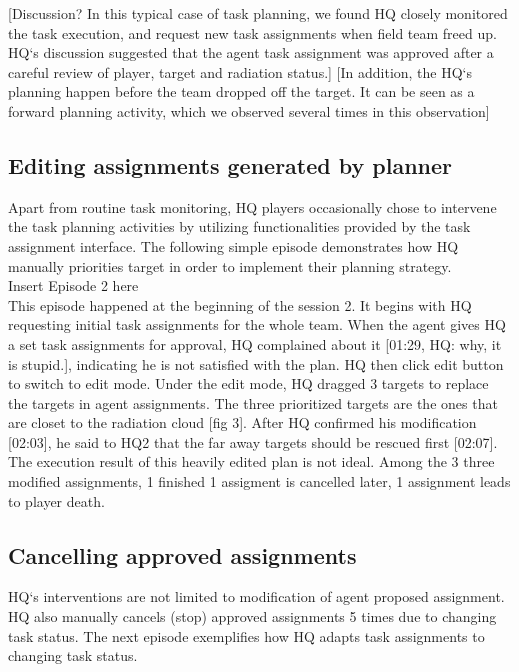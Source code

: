 [Discussion? In this typical case of task planning, we found HQ closely monitored the task execution, and request new task assignments when field team freed up. HQ`s discussion suggested that the agent task assignment was approved after a careful review of player, target and radiation status.] [In addition, the HQ`s planning happen before the team dropped off the target. It can be seen as a forward planning activity, which we observed several times in this observation]\\

\subsection{Editing assignments generated by planner}
Apart from routine task monitoring, HQ players occasionally chose to intervene the task planning activities by utilizing functionalities provided by the task assignment interface. The following simple episode demonstrates how HQ manually priorities target in order to implement their planning strategy. \\

Insert Episode 2 here\\

This episode happened at the beginning of the session 2. It begins with HQ requesting initial task assignments for the whole team. When the agent gives HQ  a set task assignments for approval, HQ complained about it [01:29, HQ: why, it is stupid.], indicating he is not satisfied with the plan. HQ then click edit button to switch to edit mode. Under the edit mode, HQ dragged 3 targets to replace the targets in agent assignments. The three prioritized targets are the ones that are closet to the radiation cloud [fig 3]. After HQ confirmed his modification [02:03], he said to HQ2 that the far away targets should be rescued first [02:07]. The execution result of this heavily edited plan is not ideal. Among the 3 three modified assignments, 1 finished 1 assigment is cancelled later, 1 assignment leads to player death.\\

\subsection{Cancelling approved assignments}
HQ`s interventions are not limited to modification of agent proposed assignment. HQ also manually cancels (stop) approved assignments 5 times due to changing task status.  The next episode exemplifies how HQ adapts task assignments to changing task status. 

